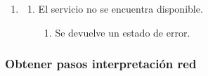 \begin{description}
\begin{enumerate}
   \setcounter{enumi}{0}
   \renewcommand{\labelenumi}{}
   \renewcommand{\labelenumiii}{\arabic{enumiii}.}
   \renewcommand{\labelenumii}{\arabic{enumi}\alph{enumii}.}
      \item 
      \begin {enumerate}
         \setcounter{enumii}{0}
         \item El servicio no se encuentra disponible.
         \begin{enumerate}
         \item Se devuelve un estado de error.
         \end{enumerate}
      \end{enumerate}
   \end{enumerate}
\end{description}


\subsubsection{Obtener pasos interpretación red} 

